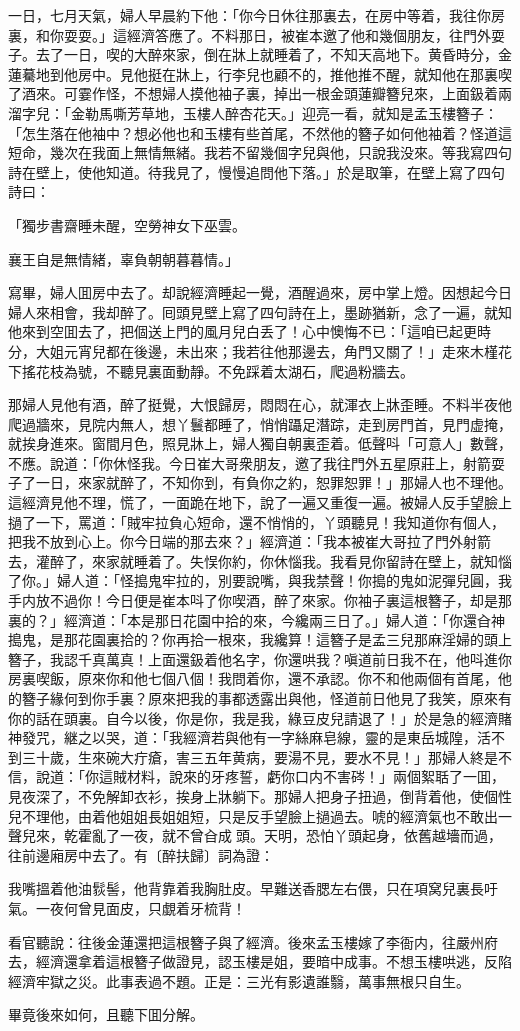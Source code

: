一日，七月天氣，婦人早晨約下他：「你今日休往那裏去，在房中等着，我往你房裏，和你耍耍。」這經濟答應了。不料那日，被崔本邀了他和幾個朋友，往門外耍子。去了一日，喫的大醉來家，倒在牀上就睡着了，不知天高地下。黄昏時分，金蓮驀地到他房中。見他挺在牀上，行李兒也顧不的，推他推不醒，就知他在那裏喫了酒來。可霎作怪，不想婦人摸他袖子裏，掉出一根金頭蓮瓣簪兒來，上面鈒着兩溜字兒：「金勒馬嘶芳草地，玉樓人醉杏花天。」迎亮一看，就知是孟玉樓簪子：「怎生落在他袖中？想必他也和玉樓有些首尾，不然他的簪子如何他袖着？怪道這短命，幾次在我面上無情無緒。我若不留幾個字兒與他，只說我没來。等我寫四句詩在壁上，使他知道。待我見了，慢慢追問他下落。」於是取筆，在壁上寫了四句詩曰：

\begin{myquote}
「獨步書齋睡未醒，空勞神女下巫雲。

襄王自是無情緒，辜負朝朝暮暮情。」
\end{myquote}

寫畢，婦人囬房中去了。却說經濟睡起一覺，酒醒過來，房中掌上燈。因想起今日婦人來相會，我却醉了。囘頭見壁上寫了四句詩在上，墨跡猶新，念了一遍，就知他來到空囬去了，把個送上門的風月兒白丢了！心中懊悔不已：「這咱已起更時分，大姐元宵兒都在後邊，未出來；我若往他那邊去，角門又關了！」走來木槿花下搖花枝為號，不聽見裏面動靜。不免踩着太湖石，爬過粉牆去。

那婦人見他有酒，醉了挺覺，大恨歸房，悶悶在心，就渾衣上牀歪睡。不料半夜他爬過牆來，見院内無人，想丫鬟都睡了，悄悄躡足潛踪，走到房門首，見門虚掩，就挨身進來。窗間月色，照見牀上，婦人獨自朝裏歪着。低聲呌「可意人」數聲，不應。說道：「你休怪我。今日崔大哥衆朋友，邀了我往門外五星原莊上，射箭耍子了一日，來家就醉了，不知你到，有負你之約，恕罪恕罪！」那婦人也不理他。這經濟見他不理，慌了，一面跪在地下，說了一遍又重復一遍。被婦人反手望臉上撾了一下，罵道：「賊牢拉負心短命，還不悄悄的，丫頭聽見！我知道你有個人，把我不放到心上。你今日端的那去來？」經濟道：「我本被崔大哥拉了門外射箭去，灌醉了，來家就睡着了。失悮你約，你休惱我。我看見你留詩在壁上，就知惱了你。」婦人道：「怪搗鬼牢拉的，別要說嘴，與我禁聲！你搗的鬼如泥彈兒圓，我手内放不過你！今日便是崔本呌了你喫酒，醉了來家。你袖子裏這根簪子，却是那裏的？」經濟道：「本是那日花園中拾的來，今纔兩三日了。」婦人道：「你還㒲神搗鬼，是那花園裏拾的？你再拾一根來，我纔算！這簪子是孟三兒那麻淫婦的頭上簪子，我認千真萬真！上面還鈒着他名字，你還哄我？嗔道前日我不在，他呌進你房裏喫飯，原來你和他七個八個！我問着你，還不承認。你不和他兩個有首尾，他的簪子緣何到你手裏？原來把我的事都透露出與他，怪道前日他見了我笑，原來有你的話在頭裏。自今以後，你是你，我是我，綠豆皮兒請退了！」於是急的經濟賭神發咒，継之以哭，道：「我經濟若與他有一字絲麻皂線，靈的是東岳城隍，活不到三十歲，生來碗大疔瘡，害三五年黄病，要湯不見，要水不見！」那婦人終是不信，說道：「你這賊材料，說來的牙疼誓，虧你口内不害硶！」兩個絮聒了一囬，見夜深了，不免解卸衣衫，挨身上牀躺下。那婦人把身子扭過，倒背着他，使個性兒不理他，由着他姐姐長姐姐短，只是反手望臉上撾過去。唬的經濟氣也不敢出一聲兒來，乾霍亂了一夜，就不曾㒲成𣭈頭。天明，恐怕丫頭起身，依舊越墻而過，往前邊廂房中去了。有〔醉扶歸〕詞為證：

\begin{myquote}
我嘴搵着他油䯼髻，他背靠着我胸肚皮。早難送香腮左右偎，只在項窝兒裏長吁氣。一夜何曾見面皮，只覷着牙梳背！
\end{myquote}

看官聽說：往後金蓮還把這根簪子與了經濟。後來孟玉樓嫁了李衙内，往嚴州府去，經濟還拿着這根簪子做證見，認玉樓是姐，要暗中成事。不想玉樓哄逃，反陷經濟牢獄之災。此事表過不題。正是：三光有影遺誰翳，萬事無根只自生。

畢竟後來如何，且聽下囬分解。

